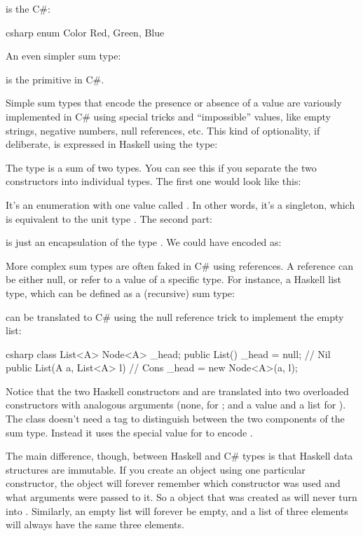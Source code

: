 is the C\#:

\begin{snip}{csharp}
enum Color { Red, Green, Blue }
\end{snip}
An even simpler sum type:

is the primitive  in C\#.

Simple sum types that encode the presence or absence of a value are
variously implemented in C\# using special tricks and ``impossible''
values, like empty strings, negative numbers, null references, etc. This
kind of optionality, if deliberate, is expressed in Haskell using the
 type:

The  type is a sum of two types. You can see this if you
separate the two constructors into individual types. The first one would
look like this:

It's an enumeration with one value called . In other
words, it's a singleton, which is equivalent to the unit type
\code{()}. The second part:

is just an encapsulation of the type . We could have encoded
 as:

More complex sum types are often faked in C\# using references. A
reference can be either null, or refer to a value of a specific type. For instance,
a Haskell list type, which can be defined as a (recursive) sum type:

can be translated to C\# using the null reference trick to implement the
empty list:

\begin{snip}{csharp}
class List<A> {
    Node<A> _head;
    public List() { _head = null; }     // Nil
    public List(A a, List<A> l)         // Cons
    {
        _head = new Node<A>(a, l);
    }
}
\end{snip}
Notice that the two Haskell constructors  and 
are translated into two overloaded  constructors with
analogous arguments (none, for ; and a value and a list for
). The  class doesn't need a tag to
distinguish between the two components of the sum type. Instead it uses
the special  value for  to encode
.

The main difference, though, between Haskell and C\# types is that
Haskell data structures are immutable. If you create an object using one
particular constructor, the object will forever remember which
constructor was used and what arguments were passed to it. So a
 object that was created as  will
never turn into . Similarly, an empty list will forever
be empty, and a list of three elements will always have the same three
elements.

